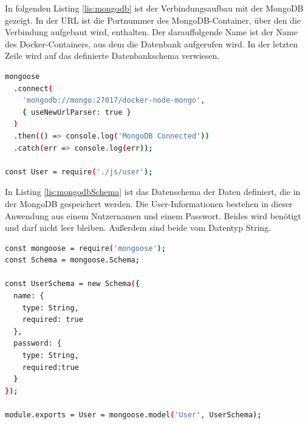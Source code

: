 In folgenden Listing \ref{lis:mongodb} ist der Verbindungsaufbau mit der MongoDB gezeigt. In der URL ist die Portnummer des MongoDB-Container, über den die Verbindung aufgebaut wird, enthalten. Der darauffolgende Name ist der Name des Docker-Containers, aus dem die Datenbank aufgerufen wird.
In der letzten Zeile wird auf das definierte Datenbankschema verwiesen. 

\begin{lstlisting}[language=bash, caption={Verbindungsaufbau mit der MongoDB}, label=lis:mongodb]
mongoose
  .connect(
    'mongodb://mongo:27017/docker-node-mongo',
    { useNewUrlParser: true }
  )
  .then(() => console.log('MongoDB Connected'))
  .catch(err => console.log(err));

const User = require('./js/user');
\end{lstlisting}

In Listing \ref{lis:mongodbSchema} ist das Datenschema der Daten definiert, die in der MongoDB gespeichert werden. Die User-Informationen bestehen in dieser Anwendung aus einem Nutzernamen und einem Passwort. Beides wird benötigt und darf nicht leer bleiben. Außerdem sind beide vom Datentyp String.
\begin{lstlisting}[language=bash, caption={Datenschema in der MongoDB}, label=lis:mongodbSchema]
const mongoose = require('mongoose');
const Schema = mongoose.Schema;

const UserSchema = new Schema({
  name: {
    type: String,
    required: true
  },
  password: {
    type: String,
    required:true
  }
});

module.exports = User = mongoose.model('User', UserSchema);
\end{lstlisting}
